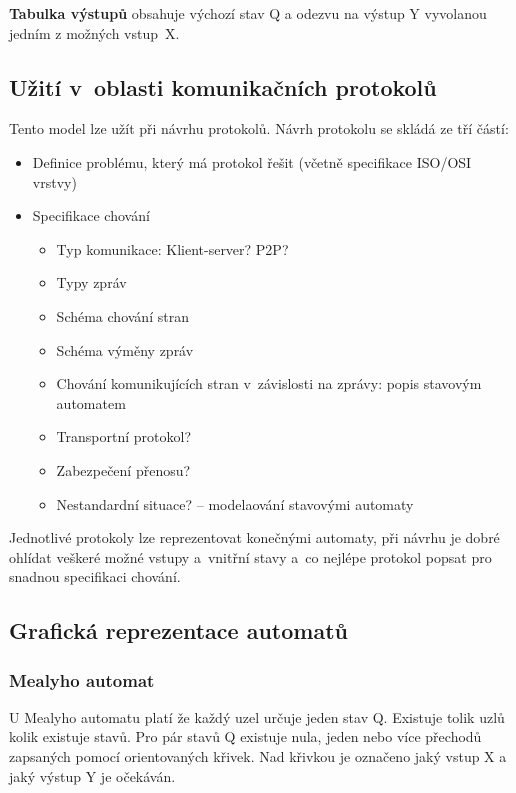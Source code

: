 \textbf{Tabulka výstupů}  obsahuje výchozí stav Q a odezvu na výstup Y vyvolanou jedním z možných vstup~X.

\subsection{Užití v~oblasti komunikačních protokolů}
Tento model lze užít při návrhu protokolů. Návrh protokolu se skládá ze tří částí:
\begin{itemize}
    \item Definice problému, který má protokol řešit (včetně specifikace ISO/OSI vrstvy)
    \item Specifikace chování
    \begin{itemize}
        \item Typ komunikace: Klient-server? P2P?
        \item Typy zpráv
        \item Schéma chování stran
        \item Schéma výměny zpráv
        \item Chování komunikujících stran v~závislosti na zprávy: popis stavovým automatem
        \item Transportní protokol?
        \item Zabezpečení přenosu?
        \item Nestandardní situace? -- modelaování stavovými automaty
    \end{itemize}
\end{itemize}

Jednotlivé protokoly lze reprezentovat konečnými automaty, při návrhu je dobré ohlídat veškeré možné vstupy a~vnitřní stavy a~co nejlépe protokol popsat pro snadnou specifikaci chování.

\subsection{Grafická reprezentace automatů}

\subsubsection{Mealyho automat}

U Mealyho automatu platí že každý uzel určuje jeden stav Q.
Existuje tolik uzlů kolik existuje stavů.
Pro pár stavů Q existuje nula, jeden nebo více přechodů zapsaných pomocí orientovaných křivek.
Nad křivkou je označeno jaký vstup X a jaký výstup Y je očekáván.

